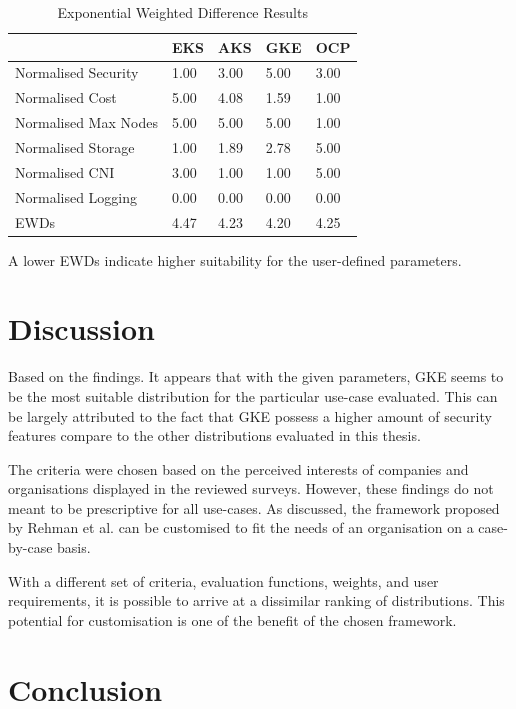 \begin{table}[!ht]
    \centering
    \begin{tabular}{|p{4cm}|p{2cm}|p{2cm}|p{2cm}|p{2cm}|} %
    \hline
         & EKS& AKS& GKE& OCP\\ \hline
        Normalised Security& 1.00& 3.00& 5.00& 3.00\\ \hline
        Normalised Cost& 5.00& 4.08& 1.59& 1.00\\ \hline
        Normalised Max Nodes& 5.00& 5.00& 5.00& 1.00\\ \hline
        Normalised Storage& 1.00& 1.89& 2.78& 5.00\\ \hline
        Normalised CNI& 3.00& 1.00& 1.00& 5.00\\ \hline
 Normalised Logging& 0.00& 0.00& 0.00&0.00\\\hline
 EWDs& 4.47& 4.23& 4.20&4.25\\\hline
    \end{tabular}
    \caption{Exponential Weighted Difference Results} 
    \label{tab:cost-analysis}
\end{table}

A lower EWDs indicate higher suitability for the user-defined parameters.


\chapter{Discussion}\label{discussion}

Based on the findings. It appears that with the given parameters, GKE seems to be the most suitable distribution for the particular use-case evaluated. This can be largely attributed to the fact that GKE possess a higher amount of security features compare to the other distributions evaluated in this thesis.

The criteria were chosen based on the perceived interests of companies and organisations displayed in the reviewed surveys. However, these findings do not meant to be prescriptive for all use-cases. As discussed, the framework proposed by Rehman et al. \cite{5976164} can be customised to fit the needs of an organisation on a case-by-case basis.

With a different set of criteria, evaluation functions, weights, and user requirements, it is possible to arrive at a dissimilar ranking of distributions. This potential for customisation is one of the benefit of the chosen framework.

\chapter{Conclusion}\label{conclusion}

